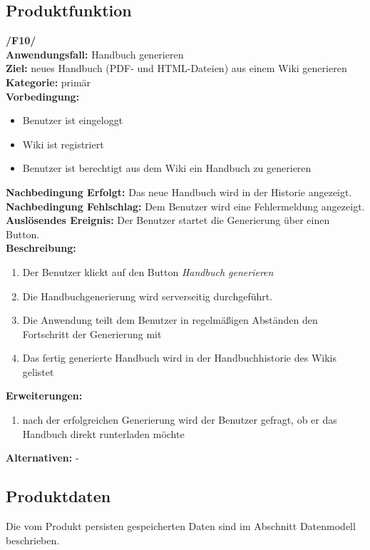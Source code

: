 \subsection*{Produktfunktion}
	\textbf{/F10/} \\
	\textbf{Anwendungsfall:} Handbuch generieren \\
	\textbf{Ziel:} neues Handbuch (PDF- und HTML-Dateien) aus einem Wiki generieren \\
	\textbf{Kategorie:} primär \\
	\textbf{Vorbedingung:}
		\begin{itemize}
			\item Benutzer ist eingeloggt
			\item Wiki ist registriert
			\item Benutzer ist berechtigt aus dem Wiki ein Handbuch zu generieren
		\end{itemize}
	\textbf{Nachbedingung Erfolgt:} Das neue Handbuch wird in der Historie angezeigt. \\
	\textbf{Nachbedingung Fehlschlag:} Dem Benutzer wird eine Fehlermeldung angezeigt. \\
	\textbf{Auslösendes Ereignis:} Der Benutzer startet die Generierung über einen Button. \\
	\textbf{Beschreibung:}
		\begin{enumerate}
			\item Der Benutzer klickt auf den Button \textit{Handbuch generieren}
			\item Die Handbuchgenerierung wird serverseitig durchgeführt.
			\item Die Anwendung teilt dem Benutzer in regelmäßigen Abständen den Fortschritt der Generierung mit
			\item Das fertig generierte Handbuch wird in der Handbuchhistorie des Wikis gelistet
		\end{enumerate}
	\textbf{Erweiterungen:}
		\begin{enumerate}
			\item nach der erfolgreichen Generierung wird der Benutzer gefragt, ob er das Handbuch direkt runterladen möchte
		\end{enumerate}
	\textbf{Alternativen:} -



\subsection*{Produktdaten}
	Die vom Produkt persisten gespeicherten Daten sind im Abschnitt Datenmodell beschrieben.

